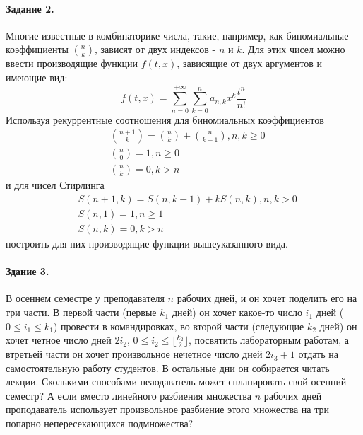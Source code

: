 \documentclass[a4paper,12pt]{article}
\begin{document}
\paragraph{Задание 2.} Многие известные в комбинаторике числа, такие, например, как биномиальные коэффициенты $\binom{n}{k}$, зависят от двух индексов - $n$ и $k$. Для этих чисел можно ввести производящие функции $f\left(t,x\right)$, зависящие от двух аргументов и имеющие вид:
\[
	f\left(t,x\right) = \sum_{n=0}^{+\infty}\sum_{k=0}^{n} a_{n,k} x^k \frac{t^n}{n!}
\]
Используя рекуррентные соотношения для биномиальных коэффициентов
\[
	\begin{split}
		& \binom{n+1}{k} = \binom{n}{k} + \binom{n}{k-1}, n,k \ge 0 \\
		& \binom{n}{0} = 1, n \ge 0 \\
		& \binom{n}{k} = 0, k > n
	\end{split}
\]
и для чисел Стирлинга
\[
	\begin{split}
		& S\left(n+1,k\right) = S\left(n,k-1\right) + k S \left(n,k\right), n,k > 0 \\
		& S\left(n,1\right) = 1, n \ge 1 \\
		& S\left(n,k\right) = 0, k > n
	\end{split}
\]
построить для них производящие функции вышеуказанного вида.

\begin{Solution}
\end{Solution}

\paragraph{Здание 3.} В осеннем семестре у преподавателя $n$ рабочих дней, и он хочет поделить его на три части. В первой части (первые $k_1$ дней) он хочет какое-то число $i_1$ дней ($0 \le i_1 \le k_1$) провести в командировках, во второй части (следующие $k_2$ дней) он хочет четное число дней $2 i_2$, $0 \le i_2 \le \lfloor \frac{k_2}{2} \rfloor$, посвятить лабораторным работам, а втретьей части он хочет произвольное нечетное число дней $2 i_3 + 1$ отдать на самостоятельную работу студентов. В остальные дни он собирается читать лекции. Сколькими способами пеаодаватель может спланировать свой осенний семестр? А если вместо линейного разбиения множества $n$ рабочих дней проподаватель использует произвольное разбиение этого множества на три попарно непересекающихся подмножества?
\end{document}
